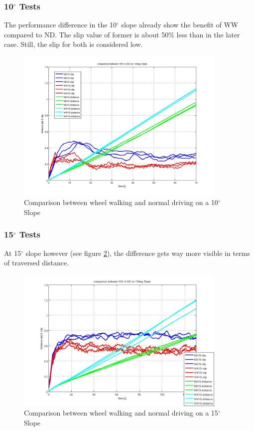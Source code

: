 \documentclass[a4paper,twocolumn]{esapub2005} %
\begin{document}
\subsubsection*{10$^{\circ}$ Tests}
The performance difference in the 10$^\circ$ slope already show the benefit of WW compared to ND. The slip value of former is about 50\% less than in the later case. Still, the slip for both is considered low.

\begin{figure}[h!]
    \centering
    \includegraphics[width=0.9\textwidth]{10d.jpg}	\caption{Comparison between
    wheel walking and normal driving on a 10$^{\circ}$ Slope} \label{fig:10d}
\end{figure}

\subsubsection*{15$^{\circ}$ Tests}
At 15$^\circ$ slope however (see figure \ref{fig:15d}), the difference gets way
more visible in terms of traversed distance.  

\begin{figure}[h!]
    \centering
    \includegraphics[width=0.9\textwidth]{15d.jpg}	\caption{Comparison between
    wheel walking and normal driving on a 15$^{\circ}$ Slope} \label{fig:15d}
\end{figure}
\end{document}
